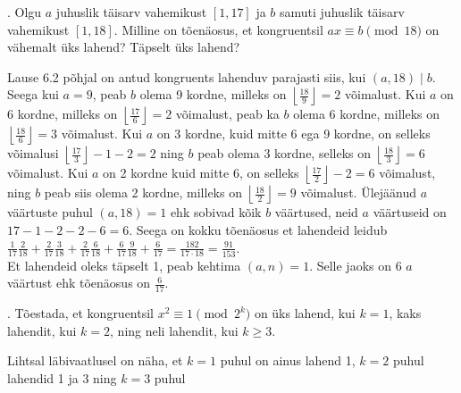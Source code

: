 \documentclass[a4paper, 10pt]{article}
\begin{document}
. Olgu $a$ juhuslik täisarv vahemikust $[1,17]$ ja $b$ samuti juhuslik täisarv vahemikust $[1,18]$. Milline on tõenäosus, et kongruentsil $ax\equiv b\pmod{18}$ on vähemalt üks lahend? Täpselt üks lahend?

\bigskip
Lause 6.2 põhjal on antud kongruents lahenduv parajasti siis, kui $(a,18)\mid b$. Seega kui $a=9$, peab $b$ olema 9 kordne, milleks on $\left\lfloor\frac{18}{9}\right\rfloor=2$ võimalust. Kui $a$ on 6 kordne, milleks on $\left\lfloor\frac{17}{6}\right\rfloor=2$ võimalust, peab ka $b$ olema 6 kordne, milleks on $\left\lfloor\frac{18}{6}\right\rfloor=3$ võimalust. Kui $a$ on 3 kordne, kuid mitte 6 ega 9 kordne, on selleks võimalusi $\left\lfloor\frac{17}{3}\right\rfloor-1-2=2$ ning $b$ peab olema 3 kordne, selleks on $\left\lfloor\frac{18}{3}\right\rfloor=6$ võimalust. Kui $a$ on 2 kordne kuid mitte 6, on selleks $\left\lfloor\frac{17}{2}\right\rfloor-2=6$ võimalust, ning $b$ peab siis olema 2 kordne, milleks on $\left\lfloor\frac{18}{2}\right\rfloor=9$ võimalust. Ülejäänud $a$ väärtuste puhul $(a,18)=1$ ehk sobivad kõik $b$ väärtused, neid $a$ väärtuseid on $17-1-2-2-6=6$. Seega on kokku tõenäosus et lahendeid leidub $\frac{1}{17}\frac{2}{18}+\frac{2}{17}\frac{3}{18}+\frac{2}{17}\frac{6}{18}+\frac{6}{17}\frac{9}{18}+\frac{6}{17}=\frac{182}{17\cdot18}=\frac{91}{153}$.\\
Et lahendeid oleks täpselt 1, peab kehtima $(a,n)=1$. Selle jaoks on 6 $a$ väärtust ehk tõenäosus on $\frac{6}{17}$.
\bigskip

. T\~oestada, et kongruentsil $x^2\equiv 1 \pmod{2^k}$ on \"uks lahend, kui $k=1$, kaks lahendit, 
kui $k=2$, ning neli lahendit, kui $k\geq 3$.

\bigskip
Lihtsal läbivaatlusel on näha, et $k=1$ puhul on ainus lahend 1, $k=2$ puhul lahendid 1 ja 3 ning $k=3$ puhul 
\bigskip
\end{document}
